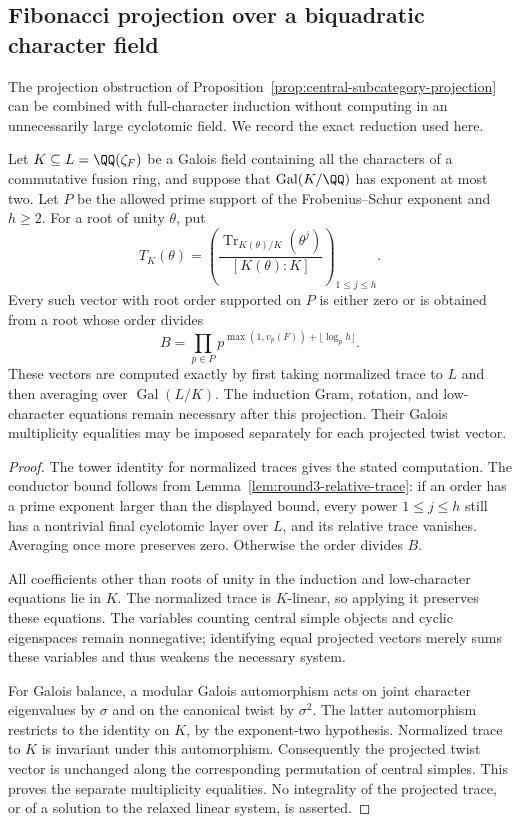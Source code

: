 \subsection{Fibonacci projection over a biquadratic character field}
\label{subsec:round4-m8-subfield}
The projection obstruction of
Proposition~\ref{prop:central-subcategory-projection} can be combined with
full-character induction without computing in an unnecessarily large
cyclotomic field.  We record the exact reduction used here.

\begin{proposition}
\label{prop:round4-subfield-traces}
Let $K\subseteq L=\QQ(\zeta_F)$ be a Galois field containing all the
characters of a commutative fusion ring, and suppose that
$\operatorname{Gal}(K/\QQ)$ has exponent at most two.  Let $P$ be the
allowed prime support of the Frobenius--Schur exponent and $h\geq2$.
For a root of unity $\theta$, put
\[
 T_K(\theta)=\left(
 \frac{\operatorname{Tr}_{K(\theta)/K}(\theta^j)}{[K(\theta):K]}
 \right)_{1\leq j\leq h}.
\]
Every such vector with root order supported on $P$ is either zero or is
obtained from a root whose order divides
\[
 B=\prod_{p\in P}p^{\max(1,v_p(F))+\lfloor\log_p h\rfloor}.
\]
These vectors are computed exactly by first taking normalized trace to
$L$ and then averaging over $\operatorname{Gal}(L/K)$.  The induction
Gram, rotation, and low-character equations remain necessary after this
projection.  Their Galois multiplicity equalities may be imposed
separately for each projected twist vector.
\end{proposition}
\begin{proof}
The tower identity for normalized traces gives the stated computation.
The conductor bound follows from Lemma~\ref{lem:round3-relative-trace}:
if an order has a prime exponent larger than the displayed bound, every
power $1\leq j\leq h$ still has a nontrivial final cyclotomic layer over
$L$, and its relative trace vanishes.  Averaging once more preserves
zero.  Otherwise the order divides $B$.

All coefficients other than roots of unity in the induction and
low-character equations lie in $K$.  The normalized trace is
$K$-linear, so applying it preserves these equations.  The variables
counting central simple objects and cyclic eigenspaces remain
nonnegative; identifying equal projected vectors merely sums these
variables and thus weakens the necessary system.

For Galois balance, a modular Galois automorphism acts on joint character
eigenvalues by $\sigma$ and on the canonical twist by $\sigma^2$.
The latter automorphism restricts to the identity on $K$, by the
exponent-two hypothesis.  Normalized trace to $K$ is invariant under
this automorphism.  Consequently the projected twist vector is
unchanged along the corresponding permutation of central simples.
This proves the separate multiplicity equalities.  No integrality of
the projected trace, or of a solution to the relaxed linear system,
is asserted.
\end{proof}

